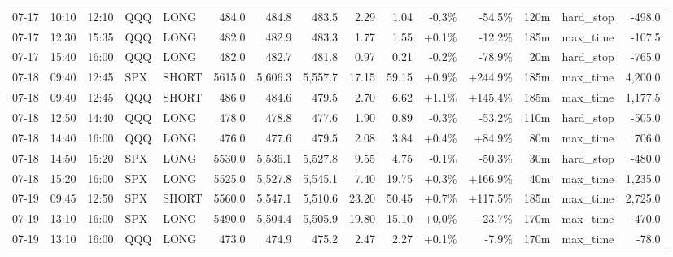 \documentclass[11pt,a4paper,twoside]{article}
\begin{document}
\begin{landscape}
\begin{center}
\begin{longtable}{>{\color{txtmain}}l l l l l r r r r r r r r >{\color{txtmain}}l r}
07-17 & 10:10 & 12:10 & QQQ & LONG & 484.0 & 484.8 & 483.5 & 2.29 & 1.04 & \textcolor{lossred}{-0.3\%} & \textcolor{lossred}{-54.5\%} & 120m & hard\_stop & \textcolor{lossred}{-498.0} \\
07-17 & 12:30 & 15:35 & QQQ & LONG & 482.0 & 482.9 & 483.3 & 1.77 & 1.55 & \textcolor{wingreen}{+0.1\%} & \textcolor{lossred}{-12.2\%} & 185m & max\_time & \textcolor{lossred}{-107.5} \\
07-17 & 15:40 & 16:00 & QQQ & LONG & 482.0 & 482.7 & 481.8 & 0.97 & 0.21 & \textcolor{lossred}{-0.2\%} & \textcolor{lossred}{-78.9\%} & 20m & hard\_stop & \textcolor{lossred}{-765.0} \\
07-18 & 09:40 & 12:45 & SPX & SHORT & 5615.0 & 5,606.3 & 5,557.7 & 17.15 & 59.15 & \textcolor{wingreen}{+0.9\%} & \textcolor{wingreen}{+244.9\%} & 185m & max\_time & \textcolor{wingreen}{4,200.0} \\
07-18 & 09:40 & 12:45 & QQQ & SHORT & 486.0 & 484.6 & 479.5 & 2.70 & 6.62 & \textcolor{wingreen}{+1.1\%} & \textcolor{wingreen}{+145.4\%} & 185m & max\_time & \textcolor{wingreen}{1,177.5} \\
07-18 & 12:50 & 14:40 & QQQ & LONG & 478.0 & 478.8 & 477.6 & 1.90 & 0.89 & \textcolor{lossred}{-0.3\%} & \textcolor{lossred}{-53.2\%} & 110m & hard\_stop & \textcolor{lossred}{-505.0} \\
07-18 & 14:40 & 16:00 & QQQ & LONG & 476.0 & 477.6 & 479.5 & 2.08 & 3.84 & \textcolor{wingreen}{+0.4\%} & \textcolor{wingreen}{+84.9\%} & 80m & max\_time & \textcolor{wingreen}{706.0} \\
07-18 & 14:50 & 15:20 & SPX & LONG & 5530.0 & 5,536.1 & 5,527.8 & 9.55 & 4.75 & \textcolor{lossred}{-0.1\%} & \textcolor{lossred}{-50.3\%} & 30m & hard\_stop & \textcolor{lossred}{-480.0} \\
07-18 & 15:20 & 16:00 & SPX & LONG & 5525.0 & 5,527.8 & 5,545.1 & 7.40 & 19.75 & \textcolor{wingreen}{+0.3\%} & \textcolor{wingreen}{+166.9\%} & 40m & max\_time & \textcolor{wingreen}{1,235.0} \\
07-19 & 09:45 & 12:50 & SPX & SHORT & 5560.0 & 5,547.1 & 5,510.6 & 23.20 & 50.45 & \textcolor{wingreen}{+0.7\%} & \textcolor{wingreen}{+117.5\%} & 185m & max\_time & \textcolor{wingreen}{2,725.0} \\
07-19 & 13:10 & 16:00 & SPX & LONG & 5490.0 & 5,504.4 & 5,505.9 & 19.80 & 15.10 & \textcolor{wingreen}{+0.0\%} & \textcolor{lossred}{-23.7\%} & 170m & max\_time & \textcolor{lossred}{-470.0} \\
07-19 & 13:10 & 16:00 & QQQ & LONG & 473.0 & 474.9 & 475.2 & 2.47 & 2.27 & \textcolor{wingreen}{+0.1\%} & \textcolor{lossred}{-7.9\%} & 170m & max\_time & \textcolor{lossred}{-78.0} \\

\end{longtable}
\end{center}
\end{landscape}
\end{document}
